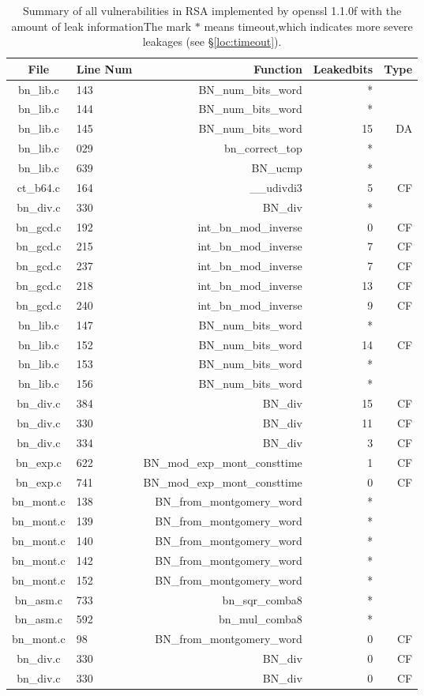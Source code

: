 \begin{table*}%
\centering
\caption{Summary of all vulnerabilities in RSA implemented by openssl 1.1.0f with the amount of leak informationThe mark $*$ means timeout,which indicates more severe leakages (see \S\ref{loc:timeout}).}\label{tab:RSAopenssl}
\begin{tabular}{clrrr}
\hline
\textbf{File} & \textbf{Line Num} & \textbf{Function} & \textbf{Leakedbits} & \textbf{Type} \\\hline
bn\_lib.c&143&BN\_num\_bits\_word&*&\\
bn\_lib.c&144&BN\_num\_bits\_word&*&\\
bn\_lib.c&145&BN\_num\_bits\_word&15&DA\\
bn\_lib.c&029&bn\_correct\_top&*&\\
bn\_lib.c&639&BN\_ucmp&*&\\
ct\_b64.c&164&\_\_udivdi3&5 &CF\\
bn\_div.c&330&BN\_div&*&\\
bn\_gcd.c&192&int\_bn\_mod\_inverse&0 &CF\\
bn\_gcd.c&215&int\_bn\_mod\_inverse&7 &CF\\
bn\_gcd.c&237&int\_bn\_mod\_inverse&7 &CF\\
bn\_gcd.c&218&int\_bn\_mod\_inverse&13&CF\\
bn\_gcd.c&240&int\_bn\_mod\_inverse&9 &CF\\
bn\_lib.c&147&BN\_num\_bits\_word&*&\\
bn\_lib.c&152&BN\_num\_bits\_word&14&CF\\
bn\_lib.c&153&BN\_num\_bits\_word&*&\\
bn\_lib.c&156&BN\_num\_bits\_word&*&\\
bn\_div.c&384&BN\_div&15&CF\\
bn\_div.c&330&BN\_div&11&CF\\
bn\_div.c&334&BN\_div&3 &CF\\
bn\_exp.c&622&BN\_mod\_exp\_mont\_consttime&1 &CF\\
bn\_exp.c&741&BN\_mod\_exp\_mont\_consttime&0 &CF\\
bn\_mont.c&138&BN\_from\_montgomery\_word&*&\\
bn\_mont.c&139&BN\_from\_montgomery\_word&*&\\
bn\_mont.c&140&BN\_from\_montgomery\_word&*&\\
bn\_mont.c&142&BN\_from\_montgomery\_word&*&\\
bn\_mont.c&152&BN\_from\_montgomery\_word&*&\\
bn\_asm.c&733&bn\_sqr\_comba8&*&\\
bn\_asm.c&592&bn\_mul\_comba8&*&\\
bn\_mont.c& 98&BN\_from\_montgomery\_word&0 &CF\\
bn\_div.c&330&BN\_div&0 &CF\\
bn\_div.c&330&BN\_div&0 &CF\\
\hline
\end{tabular}
\end{table*}